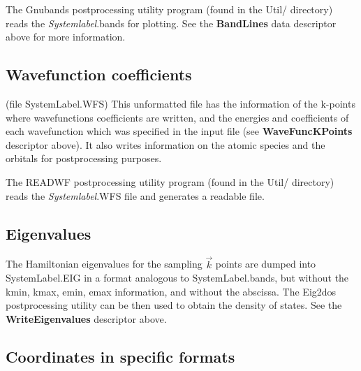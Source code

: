 \documentclass[11pt]{article}
\begin{document}
\noindent
The {\sc Gnubands} postprocessing utility
program (found in the Util/ directory) reads the {\it Systemlabel}.bands
for plotting.
See the {\bf BandLines} data descriptor above for more information.

\subsection{Wavefunction coefficients}\label{subsec:wf}
(file SystemLabel.WFS) This unformatted file has the
information of the k-points where wavefunctions coefficients
are written, and the energies and coefficients of each
wavefunction which was specified in the input file
(see {\bf WaveFuncKPoints}
descriptor above).
It also writes information on the atomic species and
the orbitals for postprocessing purposes.

\noindent
The READWF postprocessing utility
program (found in the Util/ directory) reads the {\it Systemlabel}.WFS
file and generates a readable file.

\subsection{Eigenvalues}

The Hamiltonian eigenvalues for the sampling $\vec k$ points are
dumped into SystemLabel.EIG in a format analogous to SystemLabel.bands,
but without the kmin, kmax, emin, emax information, and without
the abscissa. The {\sc Eig2dos}
postprocessing utility can be then used to obtain the density of
states. 
See the {\bf WriteEigenvalues} descriptor above.


\subsection{Coordinates in specific formats}
\end{document}
